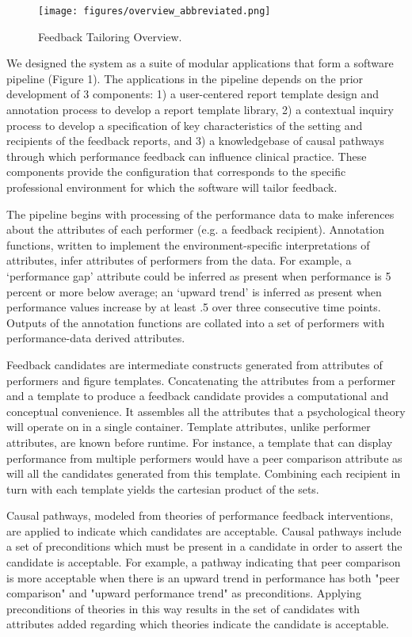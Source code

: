 \documentclass{amia}
\begin{document}
\begin{figure}[h!]
\centering
\texttt{[image: figures/overview\_abbreviated.png]}
\caption{Feedback Tailoring Overview.}
\label{fig1}
\end{figure}

We designed the system as a suite of modular applications that form a software pipeline (Figure 1). The applications in the pipeline depends on the prior development of 3 components: 1) a user-centered report template design and annotation process to develop a report template library, 2) a contextual inquiry process to develop a specification of key characteristics of the setting and recipients of the feedback reports, and 3) a knowledgebase of causal pathways through which performance feedback can influence clinical practice.
These components provide the configuration that corresponds to the specific professional environment for which the software will tailor feedback.

The pipeline begins with processing of the performance data to make inferences about the attributes of each performer (e.g. a feedback recipient). Annotation functions, written to implement the environment-specific interpretations of attributes, infer attributes of performers from the data. For example, a `performance gap' attribute could be inferred as present when performance is 5 percent or more below average; an `upward trend' is inferred as present when performance values increase by at least .5 over three consecutive time points.
Outputs of the annotation functions are collated into a set of performers with performance-data derived attributes.

Feedback candidates are intermediate constructs generated from attributes of performers and figure templates.
Concatenating the attributes from a performer and a template to produce a feedback candidate provides a computational and conceptual convenience.
It assembles all the attributes that a psychological theory will operate on in a single container.
Template attributes, unlike performer attributes, are known before runtime.
For instance, a template that can display performance from multiple performers would have a peer comparison attribute as will all the candidates generated from this template.
Combining each recipient in turn with each template yields the cartesian product of the sets.

Causal pathways, modeled from theories of performance feedback interventions\cite{kluger1996}, are applied to indicate which candidates are acceptable.
Causal pathways include a set of preconditions which must be present in a candidate in order to assert the candidate is acceptable.
For example, a pathway indicating that peer comparison is more acceptable when there is an upward trend in performance has both "peer comparison" and "upward performance trend" as preconditions.
Applying preconditions of theories in this way results in the set of candidates with attributes added regarding which theories indicate the candidate is acceptable.
\end{document}
